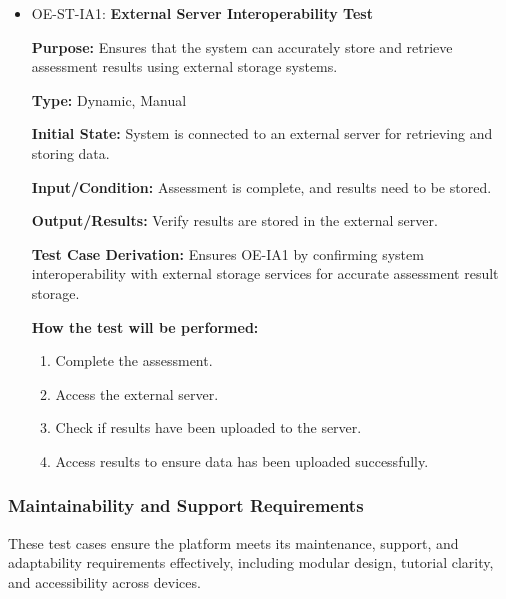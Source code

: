 \documentclass[12pt, titlepage]{article}
\begin{document}
\begin{itemize}
  \item OE-ST-IA1: \textbf{External Server Interoperability Test}
  \begin{mdframed}[linewidth=0.5mm]
      \textbf{Purpose:} Ensures that the system can accurately store and retrieve assessment results using external storage systems. \par
      \textbf{Type:} Dynamic, Manual \par
      \textbf{Initial State:} System is connected to an external server for retrieving and storing data. \par
      \textbf{Input/Condition:} Assessment is complete, and results need to be stored. \par
      \textbf{Output/Results:} Verify results are stored in the external server. \par
      \textbf{Test Case Derivation:} Ensures OE-IA1 by confirming system interoperability with external storage services for accurate assessment result storage. \par
      \textbf{How the test will be performed:}
      \begin{enumerate}[noitemsep]
        \item Complete the assessment.
        \item Access the external server.
        \item Check if results have been uploaded to the server.
        \item Access results to ensure data has been uploaded successfully.
      \end{enumerate}
  \end{mdframed}

\end{itemize}

\subsubsection{Maintainability and Support Requirements}

\hspace{2em}These test cases ensure the platform meets its maintenance, support, and adaptability requirements effectively, including modular design, tutorial clarity, and accessibility across devices.
\end{document}
